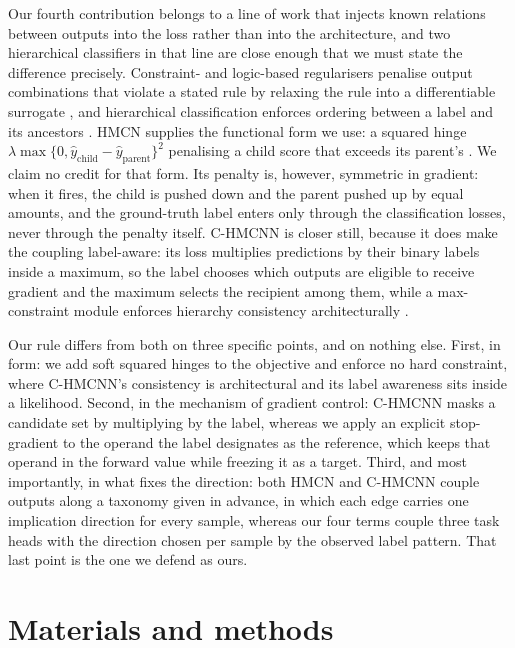 \documentclass[webpdf,modern,large,namedate]{oup-authoring-template}
\theoremstyle{thmstyleone}
\theoremstyle{thmstyletwo}
\theoremstyle{thmstylethree}
\begin{document}
Our fourth contribution belongs to a line of work that injects known relations
between outputs into the loss rather than into the architecture, and two
hierarchical classifiers in that line are close enough that we must state the
difference precisely. Constraint- and logic-based regularisers penalise output
combinations that violate a stated rule by relaxing the rule into a
differentiable surrogate \citep{xu2018semantic, hu2016harnessing}, and
hierarchical classification enforces ordering between a label and its ancestors
\citep{deng2014large}. HMCN supplies the functional form we use: a squared
hinge $\lambda\max\{0, \hat y_{\mathrm{child}} - \hat y_{\mathrm{parent}}\}^2$
penalising a child score that exceeds its parent's \citep{wehrmann2018hmcn}. We
claim no credit for that form. Its penalty is, however, symmetric in gradient:
when it fires, the child is pushed down and the parent pushed up by equal
amounts, and the ground-truth label enters only through the classification
losses, never through the penalty itself. C-HMCNN is closer still, because it
does make the coupling label-aware: its loss multiplies predictions by their
binary labels inside a maximum, so the label chooses which outputs are eligible
to receive gradient and the maximum selects the recipient among them, while a
max-constraint module enforces hierarchy consistency architecturally
\citep{giunchiglia2020chmcnn}.

Our rule differs from both on three specific points, and on nothing else.
First, in form: we add soft squared hinges to the objective and enforce no hard
constraint, where C-HMCNN's consistency is architectural and its label
awareness sits inside a likelihood. Second, in the mechanism of gradient
control: C-HMCNN masks a candidate set by multiplying by the label, whereas we
apply an explicit stop-gradient to the operand the label designates as the
reference, which keeps that operand in the forward value while freezing it as a
target. Third, and most importantly, in what fixes the direction: both HMCN and
C-HMCNN couple outputs along a taxonomy given in advance, in which each edge
carries one implication direction for every sample, whereas our four terms
couple three task heads with the direction chosen per sample by the observed
label pattern. That last point is the one we defend as ours.

\section{Materials and methods}\label{sec:method}
\end{document}
